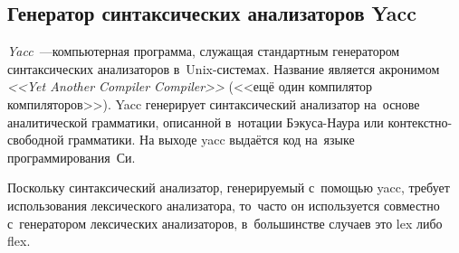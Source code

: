 \subsection{Генератор синтаксических анализаторов Yacc} \label{sub117}

\textit{Yacc}~---компьютерная программа, служащая стандартным генератором синтаксических анализаторов в~Unix-системах. Название является акронимом \textit{<<Yet Another Compiler Compiler>>} (<<ещё один компилятор компиляторов>>)\cite{Johnson1975}. Yacc генерирует синтаксический анализатор на~основе аналитической грамматики, описанной в~нотации Бэкуса-Наура или контекстно-свободной грамматики. На выходе yacc выдаётся код на~языке программирования~Си.

Поскольку синтаксический анализатор, генерируемый с~помощью yacc, требует использования лексического анализатора, то~часто он используется совместно с~генератором лексических анализаторов, в~большинстве случаев это lex либо flex. 

